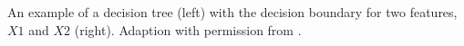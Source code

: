 An example of a decision tree (left) with the decision boundary for two features, $X1$ and $X2$ (right). Adaption with permission from \cite{Geurts_2009}.
\label{fig:decisiontree}